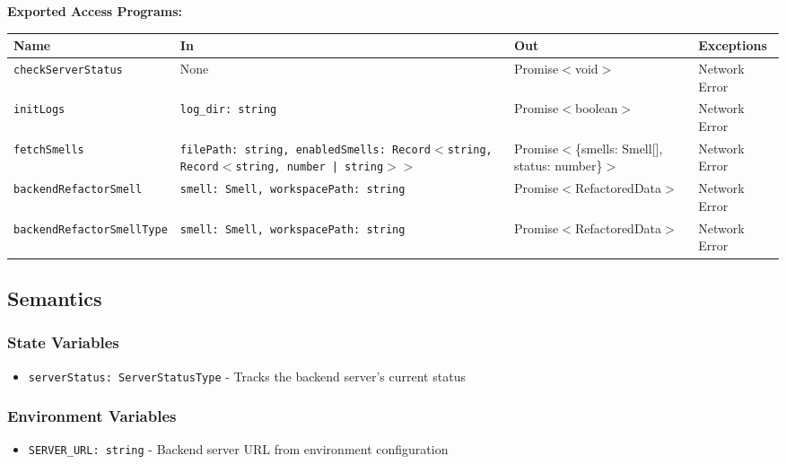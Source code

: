 \documentclass[12pt, titlepage]{article}
\begin{document}
\noindent \textbf{Exported Access Programs:}\\
\begin{tabularx}{\linewidth}{|>{\raggedright\arraybackslash}X|>{\raggedright\arraybackslash}X|>{\raggedright\arraybackslash}X|>{\raggedright\arraybackslash}X|}
    \hline
    \textbf{Name} & \textbf{In} & \textbf{Out} & \textbf{Exceptions} \\ 
    \hline
    \texttt{checkServerStatus} & None & Promise$<$void$>$ & Network Error \\
    \hline
    \texttt{initLogs} & \texttt{log\_dir: string} & Promise$<$boolean$>$ & Network Error \\
    \hline
    \texttt{fetchSmells} & \texttt{filePath: string, enabledSmells: Record$<$string, Record$<$string, number | string$>$$>$} &
    Promise$<$\{smells: Smell[], status: number\}$>$ & Network Error \\
    \hline
    \texttt{backendRefactor\allowbreak Smell} & \texttt{smell: Smell, workspacePath: string} & Promise$<$RefactoredData$>$ & Network Error \\
    \hline
    \texttt{backendRefactor\allowbreak SmellType} & \texttt{smell: Smell, workspacePath: string} & Promise$<$RefactoredData$>$ & Network Error \\
    \hline
\end{tabularx}

\subsection{Semantics}

\subsubsection{State Variables}
\begin{itemize}
    \item \texttt{serverStatus: ServerStatusType} - Tracks the backend server's current status
\end{itemize}

\subsubsection{Environment Variables}
\begin{itemize}
    \item \texttt{SERVER\_URL: string} - Backend server URL from environment configuration
\end{itemize}
\end{document}
